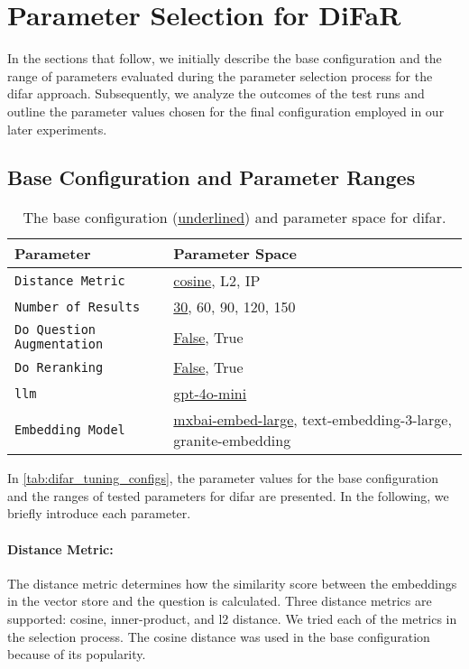 
\section{Parameter Selection for DiFaR}
\label{sec:param_selection_difar}

In the sections that follow, we initially describe the base configuration and the range of parameters evaluated during the parameter selection process for the \gls{difar} approach. Subsequently, we analyze the outcomes of the test runs and outline the parameter values chosen for the final configuration employed in our later experiments.

\subsection{Base Configuration and Parameter Ranges}

\begin{table}[t]
    \centering
    \begin{tabularx}{\textwidth}{l X}
        \toprule
        \textbf{Parameter} & Parameter Space \\
        \midrule
        \texttt{Distance Metric} & \underline{cosine}, L2, IP \\
        \texttt{Number of Results} & \underline{30}, 60, 90, 120, 150 \\
        \texttt{Do Question Augmentation} & \underline{False}, True \\
        \texttt{Do Reranking} & \underline{False}, True \\
        \texttt{\gls{llm}} & \underline{gpt-4o-mini} \\
        \texttt{Embedding Model} & \underline{mxbai-embed-large}, text-embedding-3-large, \newline granite-embedding \\
        \bottomrule
    \end{tabularx}
    \caption[Base Configuration and Parameter Space for DiFaR]{The base configuration (\underline{underlined}) and parameter space for \gls{difar}.}
    \label{tab:difar_tuning_configs}
\end{table}


In \autoref{tab:difar_tuning_configs}, the parameter values for the base configuration and the ranges of tested parameters for \gls{difar} are presented. In the following, we briefly introduce each parameter.

\paragraph{Distance Metric:} The distance metric determines how the similarity score between the embeddings in the vector store and the question is calculated. Three distance metrics are supported: cosine, inner-product, and l2 distance. We tried each of the metrics in the selection process. The cosine distance was used in the base configuration because of its popularity.

